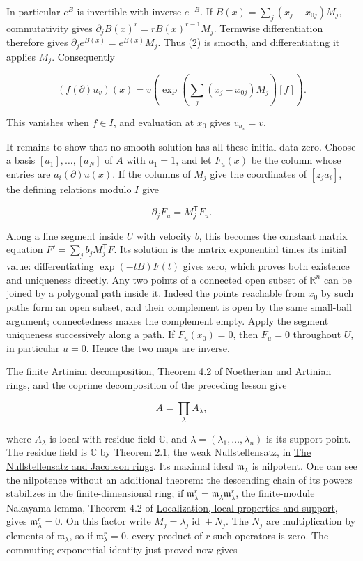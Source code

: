 \documentclass[
]{article}
\begin{document}
In particular \(e^B\) is invertible with inverse \(e^{-B}\). If
\(B(x)=\sum_j(x_j-x_{0j})M_j\), commutativity gives
\(\partial_j B(x)^r=rB(x)^{r-1}M_j\). Termwise differentiation therefore
gives \(\partial_j e^{B(x)}=e^{B(x)}M_j\). Thus (2) is smooth, and
differentiating it applies \(M_j\). Consequently

\[
(f(\partial)u_v)(x)=v\left(\exp\left(\sum_j(x_j-x_{0j})M_j\right)[f]\right).
\]

This vanishes when \(f\in I\), and evaluation at \(x_0\) gives
\(v_{u_v}=v\).

It remains to show that no smooth solution has all these initial data
zero. Choose a basis \([a_1],\ldots,[a_N]\) of \(A\) with \(a_1=1\), and
let \(F_u(x)\) be the column whose entries are \(a_i(\partial)u(x)\). If
the columns of \(M_j\) give the coordinates of \([z_ja_i]\), the
defining relations modulo \(I\) give

\[
\partial_jF_u=M_j^{\mathsf T}F_u.
\]

Along a line segment inside \(U\) with velocity \(b\), this becomes the
constant matrix equation \(F'=\sum_j b_jM_j^{\mathsf T}F\). Its solution
is the matrix exponential times its initial value: differentiating
\(\exp(-tB)F(t)\) gives zero, which proves both existence and uniqueness
directly. Any two points of a connected open subset of \(\mathbb R^n\)
can be joined by a polygonal path inside it. Indeed the points reachable
from \(x_0\) by such paths form an open subset, and their complement is
open by the same small-ball argument; connectedness makes the complement
empty. Apply the segment uniqueness successively along a path. If
\(F_u(x_0)=0\), then \(F_u=0\) throughout \(U\), in particular \(u=0\).
Hence the two maps are inverse.

The finite Artinian decomposition, Theorem 4.2 of
\href{../prerequisites/AG-CA/AG-CA-03.html}{Noetherian and Artinian
rings}, and the coprime decomposition of the preceding lesson give

\[
A=\prod_{\lambda}A_\lambda,
\]

where \(A_\lambda\) is local with residue field \(\mathbb C\), and
\(\lambda=(\lambda_1,\ldots,\lambda_n)\) is its support point. The
residue field is \(\mathbb C\) by Theorem 2.1, the weak Nullstellensatz,
in \href{../prerequisites/AG-CA/AG-CA-06.html}{The Nullstellensatz and
Jacobson rings}. Its maximal ideal \(\mathfrak m_\lambda\) is nilpotent.
One can see the nilpotence without an additional theorem: the descending
chain of its powers stabilizes in the finite-dimensional ring; if
\(\mathfrak m_\lambda^r=\mathfrak m_\lambda\mathfrak m_\lambda^r\), the
finite-module Nakayama lemma, Theorem 4.2 of
\href{../prerequisites/AG-CA/AG-CA-02.html}{Localization, local
properties and support}, gives \(\mathfrak m_\lambda^r=0\). On this
factor write \(M_j=\lambda_j\operatorname{id}+N_j\). The \(N_j\) are
multiplication by elements of \(\mathfrak m_\lambda\), so if
\(\mathfrak m_\lambda^r=0\), every product of \(r\) such operators is
zero. The commuting-exponential identity just proved now gives
\end{document}
